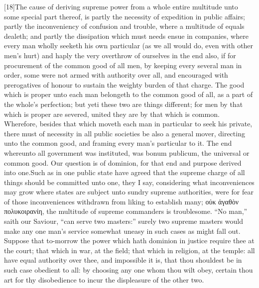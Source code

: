 [18]The cause of deriving supreme power from a whole entire multitude unto some special part thereof, is partly the necessity of expedition in public affairs; partly the inconveniency of confusion and trouble, where a multitude of equals dealeth; and partly the dissipation which must needs ensue in companies, where every man wholly seeketh his own particular (as we all would do, even with other men’s hurt) and haply the very overthrow of ourselves in the end also, if for procurement of the common good of all men, by keeping every several man in order, some were not armed with authority over all, and encouraged with prerogatives of honour to sustain the weighty burden of that charge. The good which is proper unto each man belongeth to the common good of all, as a part of the whole’s perfection; but yeti these two  are things different; for men by that which is proper are severed, united they are by that which is common. Wherefore, besides that which moveth each man in particular to seek his private, there must of necessity in all public societies be also a general mover, directing unto the common good, and framing every man’s particular to it. The end whereunto all government was instituted, was bonum publicum, the universal or common good. Our question is of dominion, for that end and purpose derived into one.Such as in one public state have agreed that the supreme charge of all things should be committed unto one, they I say, considering what inconveniences may grow where states are subject unto sundry supreme authorities, were for fear of those inconveniences withdrawn from liking to establish many; οὐκ ἀγαθὸν πολυκοιρανίη, the multitude of supreme commanders is troublesome. “No man,” saith our Saviour, “can serve two masters:” surely two supreme masters would make any one man’s service somewhat uneasy in such cases as might fall out. Suppose that to-morrow the power which hath dominion in justice require thee at the court; that which in war, at the field; that which in religion, at the temple: all have equal authority over thee, and impossible it is, that thou shouldest be in such case obedient to all: by choosing any one whom thou wilt obey, certain thou art for thy disobedience to incur the displeasure of the other two.

